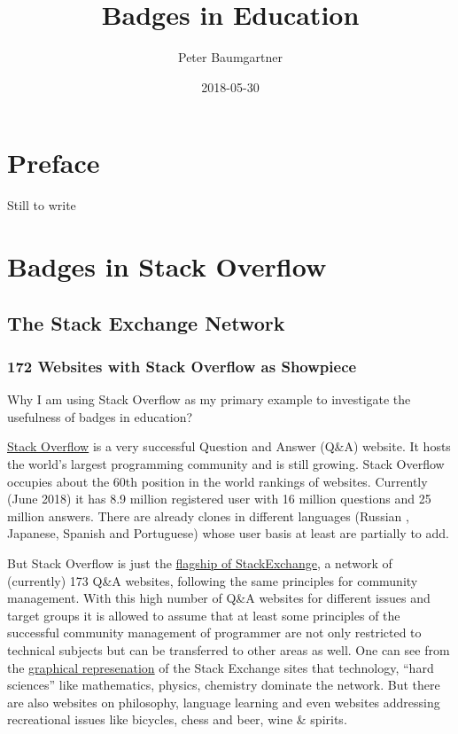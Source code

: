 \documentclass[]{book}
\title{Badges in Education}
\author{Peter Baumgartner}
\date{2018-05-30}
\theoremstyle{definition}
\theoremstyle{definition}
\theoremstyle{definition}
\theoremstyle{remark}
\begin{document}
\maketitle

{
\setcounter{tocdepth}{1}
\tableofcontents
}
\chapter{Preface}\label{preface}

Still to write

\chapter{Badges in Stack Overflow}\label{badges-in-stack-overflow}

\section{The Stack Exchange Network}\label{the-stack-exchange-network}

\subsection{172 Websites with Stack Overflow as
Showpiece}\label{websites-with-stack-overflow-as-showpiece}

Why I am using Stack Overflow as my primary example to investigate the
usefulness of badges in education?

\href{https://stackoverflow.com/}{Stack Overflow} is a very successful
Question and Answer (Q\&A) website. It hosts the world's largest
programming community and is still growing. Stack Overflow occupies
about the 60th position in the world rankings of websites. Currently
(June 2018) it has 8.9 million registered user with 16 million questions
and 25 million answers. There are already clones in different languages
(Russian , Japanese, Spanish and Portuguese) whose user basis at least
are partially to add.

But Stack Overflow is just the
\href{https://stackexchange.com/sites\#traffic}{flagship of
StackExchange}, a network of (currently) 173 Q\&A websites, following
the same principles for community management. With this high number of
Q\&A websites for different issues and target groups it is allowed to
assume that at least some principles of the successful community
management of programmer are not only restricted to technical subjects
but can be transferred to other areas as well. One can see from the
\href{https://stackexchange.com/sites?view=grid\#}{graphical
represenation} of the Stack Exchange sites that technology, ``hard
sciences'' like mathematics, physics, chemistry dominate the network.
But there are also websites on philosophy, language learning and even
websites addressing recreational issues like bicycles, chess and beer,
wine \& spirits.
\end{document}
